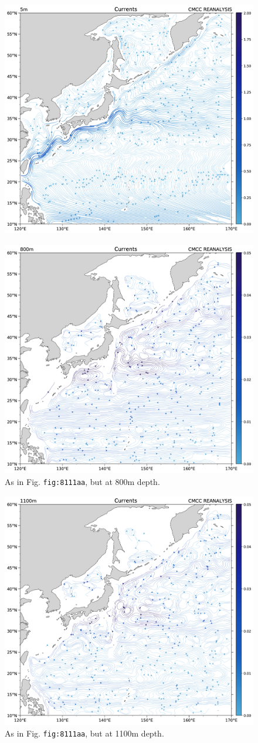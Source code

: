 \begin{figure}
	\centering
	\includegraphics[width = .7 \textwidth]{figs/GD/UVstream5mKur.png}
	\caption{} \label{fig:}
\end{figure}

\begin{figure}
	\centering
	\includegraphics[width = .7 \textwidth]{figs/GD/UVstream800mKUR.png}
	\caption{As in Fig. \texttt{fig:8111aa}, but at 800m depth.}
\end{figure}

\begin{figure}
	\centering
	\includegraphics[width = .7 \textwidth]{figs/GD/UVstream1100mKUR.png}
	\caption{As in Fig. \texttt{fig:8111aa}, but at 1100m depth.}
\end{figure}

